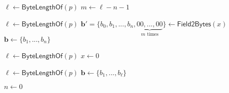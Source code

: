 \begin{algorithm}[ht]
\DontPrintSemicolon
    \caption{$\mathsf{Bytes2Point} (\boldsymbol{b})$}
    \label{alg: bytes to point}
    $\ell \gets \mathsf{ByteLengthOf}(p)$ \;
    $m \gets \ell - n - 1$ \;
\end{algorithm}

\begin{algorithm}[ht]
\DontPrintSemicolon
    \caption{$\mathsf{Point2Bytes} (M)$}
    \label{alg: point to bytes}
    $\ell \gets \mathsf{ByteLengthOf}(p)$ \;
    $\boldsymbol{b}' = \{ b_0, b_1, ..., b_n, \underbrace{00, ..., 00}_\text{$m$ times} \} \gets \mathsf{Field2Bytes}(x)$ 
    $\boldsymbol{b} \gets \{ b_1, ..., b_n \}$ \;
    
     
\end{algorithm}

\begin{algorithm}[ht]
\DontPrintSemicolon
    \caption{$\mathsf{Bytes2Field} (\boldsymbol{b})$}
    \label{alg: bytes to field}
    $\ell \gets \mathsf{ByteLengthOf}(p)$ \;
    $x \gets 0$ \;
     
\end{algorithm}

\begin{algorithm}[ht]
\DontPrintSemicolon
    \caption{$\mathsf{Field2Bytes} (x)$}
    \label{alg: field to bytes}
    $\ell \gets \mathsf{ByteLengthOf}(p)$ \;
    $\boldsymbol{b} \gets \{ b_1, ..., b_\ell \}$ \;
    
     
\end{algorithm}

\begin{algorithm}[ht]
\DontPrintSemicolon
    \caption{$\mathsf{ByteLengthOf} (x)$}
    \label{alg: bytes length of}
    $n \gets 0$ \;
     
\end{algorithm}
